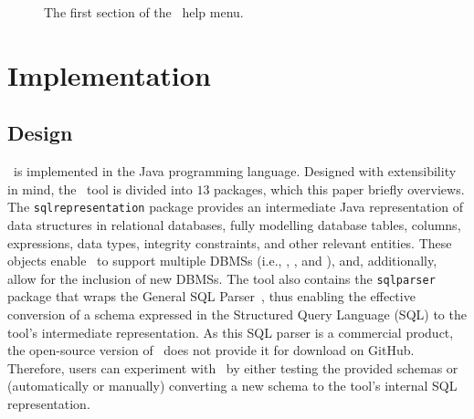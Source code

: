 \begin{figure}

\caption{\label{fig:usage} The first section of the \sa~help menu.}
\vspace*{-.1in}
\end{figure}

\section{Implementation}\label{sec:implementation}
\subsection{Design}


\sa~is implemented in the Java programming language.  Designed with extensibility in mind, the \sa~tool is divided into
$13$ packages, which this paper briefly overviews. The \texttt{sqlrepresentation} package provides an intermediate Java
representation of data structures in relational databases, fully modelling database tables, columns, expressions, data
types, integrity constraints, and other relevant entities. These objects enable \sa~to support multiple DBMSs (i.e.,
\sqlite, \postgres, and \hypersql), and, additionally, allow for the inclusion of new DBMSs. The tool also contains the
\texttt{sqlparser} package that wraps the General SQL Parser~\cite{generalsqlparser}, thus enabling the effective
conversion of a schema expressed in the Structured Query Language (SQL) to the tool's intermediate representation. As
this SQL parser is a commercial product, the open-source version of \sa~does not provide it for download on GitHub.
Therefore, users can experiment with \sa~by either testing the provided schemas or (automatically or manually)
converting a new schema to the tool's internal SQL representation.


